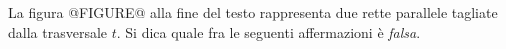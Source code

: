 La 
figura @FIGURE@ alla fine del testo
 rappresenta due rette parallele tagliate dalla 
trasversale $t$. Si dica quale fra le seguenti affermazioni è
\emph{falsa}. 
